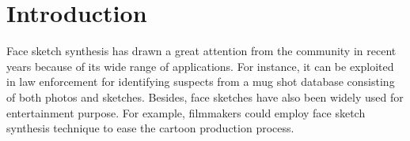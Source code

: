 \documentclass[10pt,twocolumn,letterpaper]{article}
\begin{document}
\section{Introduction}
Face sketch synthesis has drawn a great attention from the community in recent years because of its wide range of applications. For instance, it can be exploited in law enforcement for identifying suspects from a mug shot database consisting of both photos and sketches. Besides, face sketches have also been widely used for entertainment purpose. For example, filmmakers could employ face sketch synthesis technique to ease the cartoon production process.

\begin{figure}[t]
\centering
{}

\end{figure}
\end{document}
